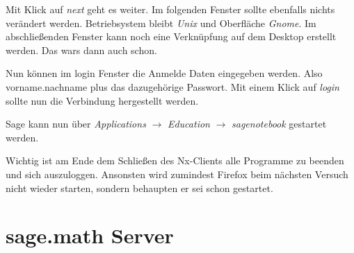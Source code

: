 \documentclass[a4paper,10pt,DIV15]{scrartcl}
\begin{document}
Mit Klick auf \emph{next} geht es weiter. Im folgenden Fenster sollte ebenfalls nichts verändert werden.
 Betriebsystem bleibt \emph{Unix} und Oberfläche \emph{Gnome}. 
Im abschließenden Fenster kann noch eine Verknüpfung auf dem Desktop erstellt werden. Das wars dann auch schon.

Nun können im login Fenster die Anmelde Daten eingegeben werden. Also vorname.nachname plus das dazugehörige Passwort. Mit einem Klick auf 
\emph{login} sollte nun die Verbindung hergestellt werden. 

Sage kann nun über \emph{Applications} $\to$ \emph{Education} $\to$ \emph{sagenotebook} gestartet werden. 

Wichtig ist am Ende  dem Schließen des Nx-Clients alle Programme zu beenden und sich auszuloggen. Ansonsten wird zumindest Firefox beim
nächsten Versuch nicht wieder starten, sondern behaupten er sei schon gestartet. 
\section{sage.math Server}
\end{document}
